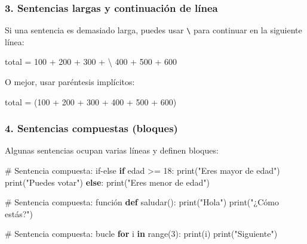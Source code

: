 \documentclass[
  doc,
  floatsintext,
  longtable,
  a4paper,
  nolmodern,
  notxfonts,
  notimes,
  12pt,
  colorlinks=true,linkcolor=blue,citecolor=blue,urlcolor=blue]{apa7}
\newenvironment{Shaded}{\begin{snugshade}}{\end{snugshade}}
\newcommand{\BuiltInTok}[1]{\textcolor[rgb]{0.00,0.23,0.31}{#1}}
\newcommand{\CommentTok}[1]{\textcolor[rgb]{0.37,0.37,0.37}{#1}}
\newcommand{\ControlFlowTok}[1]{\textcolor[rgb]{0.00,0.23,0.31}{\textbf{#1}}}
\newcommand{\DecValTok}[1]{\textcolor[rgb]{0.68,0.00,0.00}{#1}}
\newcommand{\KeywordTok}[1]{\textcolor[rgb]{0.00,0.23,0.31}{\textbf{#1}}}
\newcommand{\NormalTok}[1]{\textcolor[rgb]{0.00,0.23,0.31}{#1}}
\newcommand{\OperatorTok}[1]{\textcolor[rgb]{0.37,0.37,0.37}{#1}}
\newcommand{\StringTok}[1]{\textcolor[rgb]{0.13,0.47,0.30}{#1}}
\begin{document}
\subsubsection{3. Sentencias largas y continuación de
línea}\label{sentencias-largas-y-continuaciuxf3n-de-luxednea}

Si una sentencia es demasiado larga, puedes usar
\texttt{\textbackslash{}} para continuar en la siguiente línea:

\begin{Shaded}
\begin{Highlighting}[]
\NormalTok{total }\OperatorTok{=} \DecValTok{100} \OperatorTok{+} \DecValTok{200} \OperatorTok{+} \DecValTok{300} \OperatorTok{+} \OperatorTok{\textbackslash{}}
        \DecValTok{400} \OperatorTok{+} \DecValTok{500} \OperatorTok{+} \DecValTok{600}
\end{Highlighting}
\end{Shaded}

O mejor, usar paréntesis implícitos:

\begin{Shaded}
\begin{Highlighting}[]
\NormalTok{total }\OperatorTok{=}\NormalTok{ (}\DecValTok{100} \OperatorTok{+} \DecValTok{200} \OperatorTok{+} \DecValTok{300} \OperatorTok{+}
         \DecValTok{400} \OperatorTok{+} \DecValTok{500} \OperatorTok{+} \DecValTok{600}\NormalTok{)}
\end{Highlighting}
\end{Shaded}

\subsubsection{4. Sentencias compuestas
(bloques)}\label{sentencias-compuestas-bloques}

Algunas sentencias ocupan varias líneas y definen bloques:

\begin{Shaded}
\begin{Highlighting}[]
\CommentTok{\# Sentencia compuesta: if{-}else}
\ControlFlowTok{if}\NormalTok{ edad }\OperatorTok{\textgreater{}=} \DecValTok{18}\NormalTok{:}
    \BuiltInTok{print}\NormalTok{(}\StringTok{"Eres mayor de edad"}\NormalTok{)}
    \BuiltInTok{print}\NormalTok{(}\StringTok{"Puedes votar"}\NormalTok{)}
\ControlFlowTok{else}\NormalTok{:}
    \BuiltInTok{print}\NormalTok{(}\StringTok{"Eres menor de edad"}\NormalTok{)}

\CommentTok{\# Sentencia compuesta: función}
\KeywordTok{def}\NormalTok{ saludar():}
    \BuiltInTok{print}\NormalTok{(}\StringTok{"Hola"}\NormalTok{)}
    \BuiltInTok{print}\NormalTok{(}\StringTok{"¿Cómo estás?"}\NormalTok{)}

\CommentTok{\# Sentencia compuesta: bucle}
\ControlFlowTok{for}\NormalTok{ i }\KeywordTok{in} \BuiltInTok{range}\NormalTok{(}\DecValTok{3}\NormalTok{):}
    \BuiltInTok{print}\NormalTok{(i)}
    \BuiltInTok{print}\NormalTok{(}\StringTok{"Siguiente"}\NormalTok{)}
\end{Highlighting}
\end{Shaded}
\end{document}
